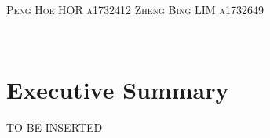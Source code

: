 \documentclass[12pt]{report}
\begin{document}
\begin{titlepage}
\begin{minipage}{0.5\textwidth}
\begin{flushleft}
\end{flushleft}
\end{minipage}
~
\begin{minipage}{0.4\textwidth}
\begin{flushright} \small
  \textsc{Peng Hoe HOR}
   \linebreak
 \textsc{a1732412}
 \linebreak
  \linebreak
  \textsc{Zheng Bing LIM}
   \linebreak
 \textsc{a1732649}
 \linebreak
 \linebreak
  \linebreak
\end{flushright}
\end{minipage}\\[0.5cm]
\end{titlepage}

\section*{Executive Summary}
TO BE INSERTED
\setcounter{page}{2} %
\pagebreak

\end{document}
